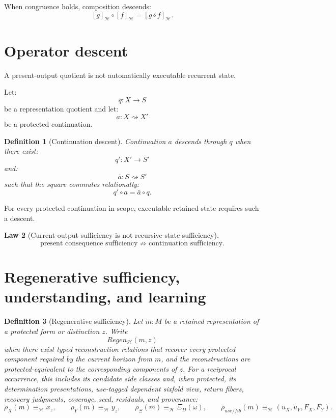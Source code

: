 \documentclass[11pt,oneside]{article}
\newtheorem{definition}{Definition}[section]
\newtheorem{law}[definition]{Law}
\begin{document}
When congruence holds, composition descends:
\[
\boxed{
[g]_{\mathcal H}\circ[f]_{\mathcal H}
=
[g\circ f]_{\mathcal H}.
}
\]

\section{Operator descent}

A present-output quotient is not automatically executable recurrent state.

Let:
\[
q:X\to S
\]
be a representation quotient and let:
\[
a:X\rightsquigarrow X'
\]
be a protected continuation.

\begin{definition}[Continuation descent]
Continuation \(a\) descends through \(q\) when there exist:
\[
q':X'\to S'
\]
and:
\[
\bar a:S\rightsquigarrow S'
\]
such that the square commutes relationally:
\[
\boxed{
q'\circ a
=
\bar a\circ q.
}
\]
\end{definition}

For every protected continuation in scope, executable retained state requires such a descent.

\begin{law}[Current-output sufficiency is not recursive-state sufficiency]
\[
\boxed{
\text{present consequence sufficiency}
\not\Rightarrow
\text{continuation sufficiency}.
}
\]
\end{law}


\section{Regenerative sufficiency, understanding, and learning}

\begin{definition}[Regenerative sufficiency]
Let \(m:M\) be a retained representation of a protected form or distinction \(z\).  Write
\[
\boxed{
Regen_{\mathcal H}(m,z)
}
\]
when there exist typed reconstruction relations that recover every protected component required by the current horizon from \(m\), and the reconstructions are protected-equivalent to the corresponding components of \(z\).  For a reciprocal occurrence, this includes its candidate side classes and, when protected, its determination presentations, use-tagged dependent sixfold view, return fibers, recovery judgments, coverage, seed, residuals, and provenance:
\[
\rho_X(m)\equiv_{\mathcal H}x_z,
\qquad
\rho_Y(m)\equiv_{\mathcal H}y_z,
\qquad
\rho_{\Xi}(m)\equiv_{\mathcal H}\Xi_D(\omega),
\qquad
\rho_{use/fib}(m)\equiv_{\mathcal H}(u_X,u_Y,F_X,F_Y).
\]
\end{definition}
\end{document}
